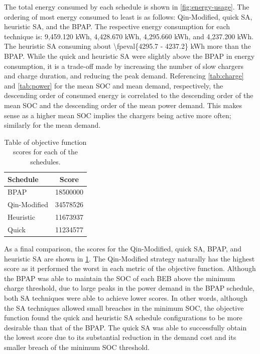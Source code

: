 \documentclass[energies,article,submit,moreauthors]{Definitions/mdpi}
\begin{document}
The total energy consumed by each schedule is shown in \ref{fig:energy-usage}. The ordering of most energy consumed to
least is as follows: Qin-Modified, quick SA, heuristic SA, and the BPAP. The respective energy consumption for each
technique is: 9,459.120 kWh, 4,428.670 kWh, 4,295.660 kWh, and 4,237.200 kWh. The heuristic SA consuming about
\num{\fpeval{4295.7 - 4237.2}} kWh more than the BPAP. While the quick and heuristic SA were slightly above
the BPAP in energy consumption, it is a trade-off made by increasing the number of slow chargers and charge duration,
and reducing the peak demand. Referencing \ref{tab:charge} and \ref{tab:power} for the mean SOC and mean demand, respectively,
the descending order of consumed energy is correlated to the descending order of the mean SOC and the descending order
of the mean power demand. This makes sense as a higher mean SOC implies the chargers being active more often; similarly
for the mean demand.

\begin{table}[htbp]
\caption{\label{tab:scores}Table of objective function scores for each of the schedules.}
\centering
\begin{tabular}{l|c}
\hline
Schedule & Score\\[0pt]
\hline
BPAP & \num{18500000}\\[0pt]
Qin-Modified & \num{34578526}\\[0pt]
Heuristic & \num{11673937}\\[0pt]
Quick & \num{11234577}\\[0pt]
\hline
\end{tabular}
\end{table}

As a final comparison, the scores for the Qin-Modified, quick SA, BPAP, and heuristic SA are shown in \ref{tab:scores}. The
Qin-Modified strategy naturally has the highest score as it performed the worst in each metric of the objective
function. Although the BPAP was able to maintain the SOC of each BEB above the minimum charge threshold, due to large
peaks in the power demand in the BPAP schedule, both SA techniques were able to achieve lower scores. In other words,
although the SA techniques allowed small breaches in the minimum SOC, the objective function found the quick and
heuristic SA schedule configurations to be more desirable than that of the BPAP. The quick SA was able to successfully
obtain the lowest score due to its substantial reduction in the demand cost and its smaller breach of the minimum SOC
threshold.
\end{document}
